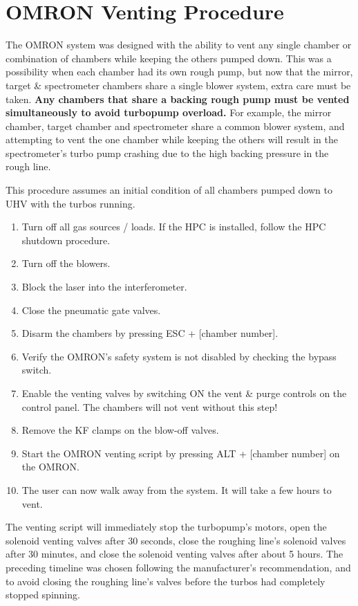 \section{OMRON Venting Procedure}

The OMRON system was designed with the ability to vent any single chamber or combination of chambers while keeping the others pumped down. This was a possibility when each chamber had its own rough pump, but now that the mirror, target \& spectrometer chambers share a single blower system, extra care must be taken. \textbf{Any chambers that share a backing rough pump must be vented simultaneously to avoid turbopump overload.} For example, the mirror chamber, target chamber and spectrometer share a common blower system, and attempting to vent the one chamber while keeping the others will result in the spectrometer's turbo pump crashing due to the high backing pressure in the rough line.

This procedure assumes an initial condition of all chambers pumped down to UHV with the turbos running.

\begin{enumerate}
	\item Turn off all gas sources / loads. If the HPC is installed, follow the HPC shutdown procedure.
	\item Turn off the blowers.
	\item Block the laser into the interferometer.
	\item Close the pneumatic gate valves.
	\item Disarm the chambers by pressing ESC + [chamber number].
	\item Verify the OMRON's safety system is not disabled by checking the bypass switch.
	\item Enable the venting valves by switching ON the vent \& purge controls on the control panel. The chambers will not vent without this step!
	\item Remove the KF clamps on the blow-off valves.
	\item Start the OMRON venting script by pressing ALT + [chamber number] on the OMRON.
	\item The user can now walk away from the system. It will take a few hours to vent.
\end{enumerate}

The venting script will immediately stop the turbopump's motors, open the solenoid venting valves after 30 seconds, close the roughing line's solenoid valves after 30 minutes, and close the solenoid venting valves after about 5 hours. The preceding timeline was chosen following the manufacturer's recommendation, and to avoid closing the roughing line's valves before the turbos had completely stopped spinning. 

